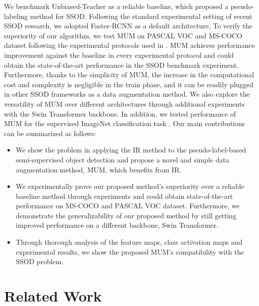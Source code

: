 \documentclass[10pt,twocolumn,letterpaper]{article}
\begin{document}
We benchmark Unbiased-Teacher\cite{liu2021unbiased} as a reliable baseline, which proposed a pseudo-labeling method for SSOD.
Following the standard experimental setting of recent SSOD research, we adopted Faster-RCNN\cite{ren2015faster} as a default architecture.
To verify the superiority of our algorithm, we test MUM on PASCAL VOC\cite{everingham2010pascal} and MS-COCO\cite{lin2014microsoft} dataset following the experimental protocols used in \cite{liu2021unbiased}.
MUM achieves performance improvement against the baseline in every experimental protocol and could obtain the state-of-the-art performance in the SSOD benchmark experiment.
Furthermore, thanks to the simplicity of MUM, the increase in the computational cost and complexity is negligible in the train phase, 
and it can be readily plugged in other SSOD frameworks as a data augmentation method.
We also explore the versatility of MUM over different architectures through additional experiments with the Swin Transformer backbone.
In addition, we tested performance of MUM for the supervised ImageNet classification task \cite{deng2009imagenet}.
Our main contributions can be summarized as follows:

\begin{itemize}[leftmargin=*]
\vspace{-2mm}
\item We show the problem in applying the IR method to the pseudo-label-based semi-supervised object detection and propose a novel and simple data augmentation method, MUM, which benefits from IR.
\vspace{-2mm}
\item We experimentally prove our proposed method's superiority over a reliable baseline method through experiments and could obtain state-of-the-art performance on MS-COCO and PASCAL VOC dataset. 
Furthermore, we demonstrate the generalizability of our proposed method by still getting improved performance on a different backbone, Swin Transformer.
\vspace{-2mm}
\item Through thorough analysis of the feature maps, class activation maps and experimental results, we show the proposed MUM's compatibility with the SSOD problem.
\end{itemize}


\section{Related Work}
\label{sec:related}
\end{document}
